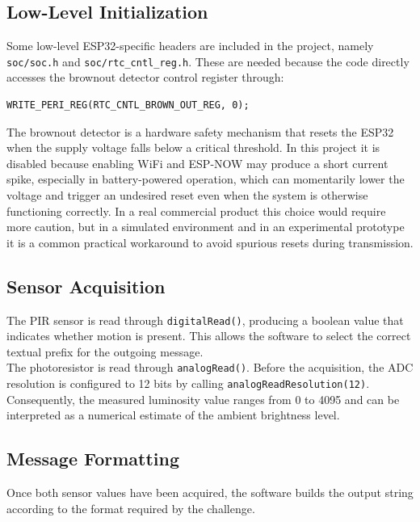 \documentclass[a4paper,11pt]{article}
\begin{document}
\subsection{Low-Level Initialization}

Some low-level ESP32-specific headers are included in the project, namely
\texttt{soc/soc.h} and \texttt{soc/rtc\_cntl\_reg.h}. These are needed because the
code directly accesses the brownout detector control register through:\\

\begin{lstlisting}
WRITE_PERI_REG(RTC_CNTL_BROWN_OUT_REG, 0);
\end{lstlisting}

The brownout detector is a hardware safety mechanism that resets the ESP32 when the
supply voltage falls below a critical threshold. In this project it is disabled
because enabling WiFi and ESP-NOW may produce a short current spike, especially in
battery-powered operation, which can momentarily lower the voltage and trigger an
undesired reset even when the system is otherwise functioning correctly. In a real
commercial product this choice would require more caution, but in a simulated
environment and in an experimental prototype it is a common practical workaround to
avoid spurious resets during transmission.

\subsection{Sensor Acquisition}

The PIR sensor is read through \texttt{digitalRead()}, producing a boolean value that
indicates whether motion is present. This allows the software to select the correct
textual prefix for the outgoing message.\\

The photoresistor is read through \texttt{analogRead()}. Before the acquisition, the
ADC resolution is configured to 12 bits by calling \texttt{analogReadResolution(12)}.
Consequently, the measured luminosity value ranges from 0 to 4095 and can be
interpreted as a numerical estimate of the ambient brightness level.

\subsection{Message Formatting}

Once both sensor values have been acquired, the software builds the output string
according to the format required by the challenge.\\
\end{document}
